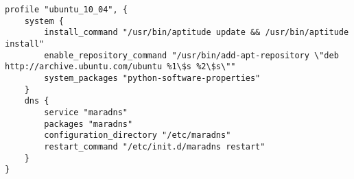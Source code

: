 \begin{lstlisting}[style=Java,label=lst:dns_ubuntu_profile,caption=MaraDns Example Ubuntu Profile]
profile "ubuntu_10_04", {
    system {
        install_command "/usr/bin/aptitude update && /usr/bin/aptitude install"
        enable_repository_command "/usr/bin/add-apt-repository \"deb http://archive.ubuntu.com/ubuntu %1\$s %2\$s\""
        system_packages "python-software-properties"
    }
    dns {
        service "maradns"
        packages "maradns"
        configuration_directory "/etc/maradns"
        restart_command "/etc/init.d/maradns restart"
    }
}
\end{lstlisting}

